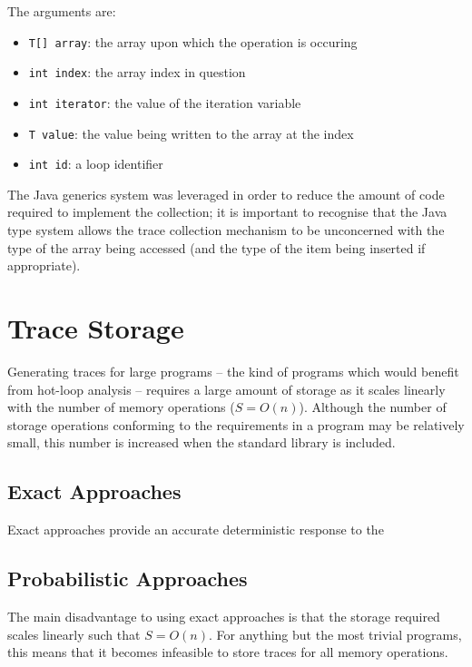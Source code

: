 The arguments are:

\begin{itemize} \label{items:trace-args}
	\item \texttt{T[] array}: the array upon which the operation is occuring
	\item \texttt{int index}: the array index in question
	\item \texttt{int iterator}: the value of the iteration variable
	\item \texttt{T value}: the value being written to the array at the index
	\item \texttt{int id}: a loop identifier
\end{itemize}

The Java generics system was leveraged in order to reduce the amount of code required to implement the collection; it is important to recognise that the Java type system allows the trace collection mechanism to be unconcerned with the type of the array being accessed (and the type of the item being inserted if appropriate).

\section{Trace Storage} \label{sec:runtime/storage}
Generating traces for large programs -- the kind of programs which would benefit from hot-loop analysis -- requires a large amount of storage as it scales linearly with the number of memory operations ($S=O(n)$). Although the number of storage operations conforming to the requirements in a program may be relatively small, this number is increased when the standard library is included.
	
	\subsection{Exact Approaches} \label{sec:runtime/storage/exact}
	Exact approaches provide an accurate deterministic response to the 

	\subsection{Probabilistic Approaches} \label{sec:runtime/storage/probabilistic}
	The main disadvantage to using exact approaches is that the storage required scales linearly such that $S=O(n)$. For anything but the most trivial programs, this means that it becomes infeasible to store traces for all memory operations.
	
